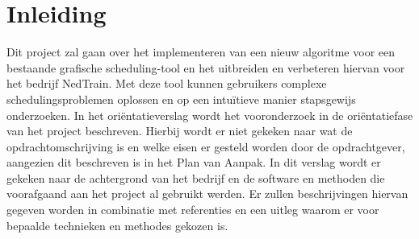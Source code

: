 \section{Inleiding}
Dit project zal gaan over het implementeren van een nieuw algoritme voor een bestaande grafische scheduling-tool en het uitbreiden en verbeteren hiervan voor het bedrijf NedTrain. Met deze tool kunnen gebruikers complexe schedulingsproblemen oplossen en op een intu\"itieve manier stapsgewijs onderzoeken. In het ori\"entatieverslag wordt het vooronderzoek in de ori\"entatiefase van het project beschreven. Hierbij wordt er niet gekeken naar wat de opdrachtomschrijving is en welke eisen er gesteld worden door de opdrachtgever, aangezien dit beschreven is in het Plan van Aanpak. In dit verslag wordt er gekeken naar de achtergrond van het bedrijf en de software en methoden die voorafgaand aan het project al gebruikt werden. Er zullen beschrijvingen hiervan gegeven worden in combinatie met referenties en een uitleg waarom er voor bepaalde technieken en methodes gekozen is.
